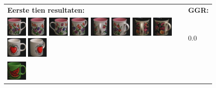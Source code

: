 \begin{figure}[!bp]
\vspace{5pt}
\centering
\begin{tabular}{m{11cm} | m{3cm} |}
\textbf{Eerste tien resultaten:} & \textbf{GGR:} \\
\vspace{4pt}
\includegraphics[width=1cm]{coil/beeld-6.eps}
\includegraphics[width=1cm]{coil/beeld-8.eps}
\includegraphics[width=1cm]{coil/beeld-7.eps}
\includegraphics[width=1cm]{coil/beeld-9.eps}
\includegraphics[width=1cm]{coil/beeld-11.eps}
\includegraphics[width=1cm]{coil/beeld-10.eps}
\includegraphics[width=1cm]{coil/beeld-65.eps}
\includegraphics[width=1cm]{coil/beeld-64.eps}
\includegraphics[width=1cm]{coil/beeld-36.eps}
\includegraphics[width=1cm]{coil/beeld-39.eps}
& {\scriptsize 0.0}
\\
\includegraphics[width=1cm]{coil/beeld-30.eps}

\end{tabular}
\end{figure}
